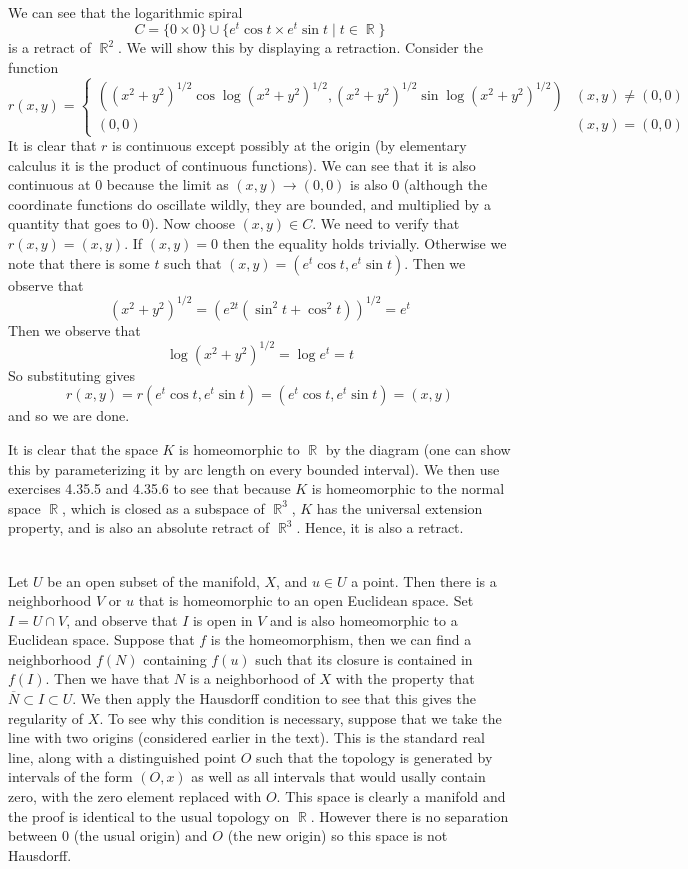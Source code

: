 \documentclass{article}
\DeclareMathOperator{\R}{\mathbb{R}}
\DeclareMathOperator{\suchthat}{\mathrel{|}}
\newcommand{\problem}[1]{\noindent{\textbf{Problem #1}}\\}
\newcommand{\problempart}[1]{\noindent{\textbf{(#1)}}}
\begin{document}
\problem{4.35.7}
\problempart{a} We can see that the logarithmic spiral 
\[
C = \{0 \times 0\} \cup \{e^{t}\cos t \times e^t\sin t \suchthat t\in \R\}
\]
is a retract of $\R^2$. We will show this by displaying a retraction. Consider the function
\[
r(x,y) = \begin{cases}
\left((x^2+y^2)^{1/2}\cos\log(x^2+y^2)^{1/2}, (x^2+y^2)^{1/2}\sin\log(x^2+y^2)^{1/2}\right) & (x,y) \neq (0,0) \\
(0,0) & (x,y) = (0,0)
\end{cases}
\]
It is clear that $r$ is continuous except possibly at the origin (by elementary calculus it is the product of continuous functions). We can see that it is also continuous at 0 because the limit as $(x,y) \to (0,0)$ is also 0 (although the coordinate functions do oscillate wildly, they are bounded, and multiplied by a quantity that goes to 0). Now choose $(x,y) \in C$. We need to verify that $r(x,y) = (x,y)$. If $(x,y) = 0$ then the equality holds trivially. Otherwise we note that there is some $t$ such that $(x,y) = (e^t\cos t, e^t\sin t)$. Then we observe that 
\[
(x^2+y^2)^{1/2} = (e^{2t}(\sin^2t + \cos^2t))^{1/2} = e^t
\]
Then we observe that 
\[
\log(x^2+y^2)^{1/2} = \log e^t = t
\]
So substituting gives
\[
r(x,y) = r(e^t\cos t, e^t\sin t) = (e^t\cos t, e^t\sin t) = (x,y)
\]
and so we are done. 

\problempart{b} It is clear that the space $K$ is homeomorphic to $\R$ by the diagram (one can show this by parameterizing it by arc length on every bounded interval). We then use exercises 4.35.5 and 4.35.6 to see that because $K$ is homeomorphic to the normal space $\R$, which is closed as a subspace of $\R^3$, $K$ has the universal extension property, and is also an absolute retract of $\R^3$. Hence, it is also a retract. 
 
\problem{4.36.1} Let $U$ be an open subset of the manifold, $X$, and $u \in U$ a point.  Then there is a neighborhood $V$ or $u$ that is homeomorphic to an open Euclidean space. Set $I = U \cap V$, and observe that $I$ is open in $V$ and is also homeomorphic to a Euclidean space. Suppose that $f$ is the homeomorphism, then we can find a neighborhood $f(N)$ containing $f(u)$ such that its closure is contained in $f(I)$. Then we have that $N$ is a neighborhood of $X$ with the property that $\overline{N} \subset I \subset U$. We then apply the Hausdorff condition to see that this gives the regularity of $X$. To see why this condition is necessary, suppose that we take the line with two origins (considered earlier in the text). This is the standard real line, along with a distinguished point $O$ such that the topology is generated by intervals of the form $(O, x)$ as well as all intervals that would usally contain zero, with the zero element replaced with $O$. This space is clearly a manifold and the proof is identical to the usual topology on $\R$. However there is no separation between $0$ (the usual origin) and $O$ (the new origin) so this space is not Hausdorff. 
 
\end{document}
